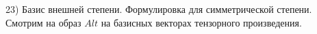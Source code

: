 23) Базис внешней степени. Формулировка для симметрической степени.\\
Смотрим на образ $Alt$ на базисных векторах тензорного произведения.\\
